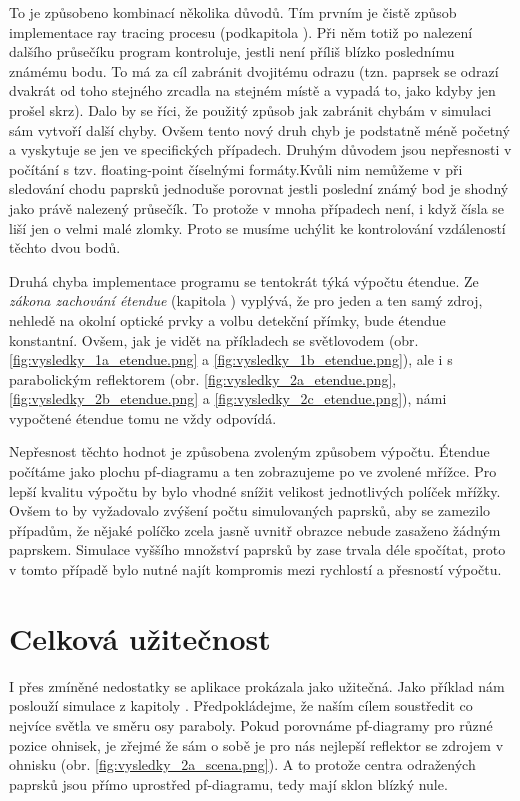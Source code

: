 To je způsobeno kombinací několika důvodů. Tím prvním je čistě způsob implementace ray tracing procesu (podkapitola ). Při něm totiž po nalezení dalšího průsečíku program kontroluje, jestli není příliš blízko poslednímu známému bodu. To má za cíl zabránit dvojitému odrazu (tzn. paprsek se odrazí dvakrát od toho stejného zrcadla na stejném místě a vypadá to, jako kdyby jen prošel skrz). Dalo by se říci, že použitý způsob jak zabránit chybám v simulaci sám vytvoří další chyby. Ovšem tento nový druh chyb je podstatně méně početný a vyskytuje se jen ve specifických případech. Druhým důvodem jsou nepřesnosti v počítání s tzv. floating-point číselnými formáty.\src Kvůli nim nemůžeme v při sledování chodu paprsků jednoduše porovnat jestli poslední známý bod je shodný jako právě nalezený průsečík. To protože v mnoha případech není, i když čísla se liší jen o velmi malé zlomky. Proto se musíme uchýlit ke kontrolování vzdáleností těchto dvou bodů.

Druhá chyba implementace programu se tentokrát týká výpočtu étendue. Ze \emph{zákona zachování étendue} (kapitola ) vyplývá, že pro jeden a ten samý zdroj, nehledě na okolní optické prvky a volbu detekční přímky, bude étendue konstantní. Ovšem, jak je vidět na příkladech se světlovodem (obr. \ref{fig:vysledky_1a_etendue.png} a \ref{fig:vysledky_1b_etendue.png}), ale i s parabolickým reflektorem (obr. \ref{fig:vysledky_2a_etendue.png}, \ref{fig:vysledky_2b_etendue.png} a \ref{fig:vysledky_2c_etendue.png}), námi vypočtené étendue tomu ne vždy odpovídá.

Nepřesnost těchto hodnot je způsobena zvoleným způsobem výpočtu. Étendue počítáme jako plochu pf-diagramu a ten zobrazujeme po ve zvolené mřížce. Pro lepší kvalitu výpočtu by bylo vhodné snížit velikost jednotlivých políček mřížky. Ovšem to by vyžadovalo zvýšení počtu simulovaných paprsků, aby se zamezilo případům, že nějaké políčko zcela jasně uvnitř obrazce nebude zasaženo žádným paprskem. Simulace vyššího množství paprsků by zase trvala déle spočítat, proto v tomto případě bylo nutné najít kompromis mezi rychlostí a přesností výpočtu.


\section{Celková užitečnost}

I přes zmíněné nedostatky se aplikace prokázala jako užitečná. Jako příklad nám poslouží simulace z kapitoly . Předpokládejme, že naším cílem soustředit co nejvíce světla ve směru osy paraboly. Pokud porovnáme pf-diagramy pro různé pozice ohnisek, je zřejmé že sám o sobě je pro nás nejlepší reflektor se zdrojem v ohnisku (obr. \ref{fig:vysledky_2a_scena.png}). A to protože centra odražených paprsků jsou přímo uprostřed pf-diagramu, tedy mají sklon blízký nule.


